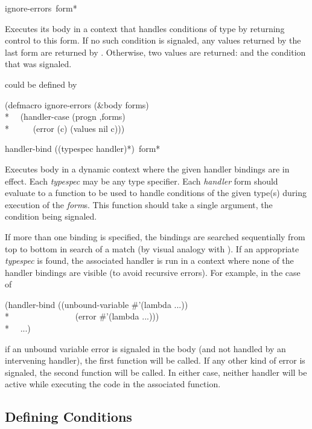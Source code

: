 \begin{defmac}
ignore-errors {\,form}*

  Executes its body in a context that handles conditions of type  by
  returning control to this form. If no such condition is signaled, any
  values returned by the last form are returned by . Otherwise,
  two values are returned:  and the  condition that was signaled.

 could be defined by
\begin{lisp}
(defmacro ignore-errors (\&body forms) \\*
~~{\Xbq}(handler-case (progn ,{\Xatsign}forms) \\*
~~~~~(error (c) (values nil c)))
\end{lisp}
\end{defmac}


\begin{defmac}
handler-bind ({(typespec handler)}*) {\,form}*

  Executes body in a dynamic context where the given handler bindings 
  are in effect.
  Each {\it typespec} may be any type specifier.
  Each {\it handler} form should evaluate to a function to be used to handle conditions 
  of the given type(s) during execution of the {\it form\/}s. This function should
  take a single argument, the condition being signaled.

  If more than one binding is specified, the bindings are searched 
  sequentially from top to bottom in search of a match (by visual analogy
  with ). If an appropriate {\it typespec} is found, the associated handler 
  is run in a context where none of the handler bindings are visible (to avoid
  recursive errors). For example, in the case of
\begin{lisp}
(handler-bind ((unbound-variable \#'(lambda ...)) \\*
~~~~~~~~~~~~~~~(error \#'(lambda ...))) \\*
~~...)
\end{lisp}
  if an unbound variable error is signaled in the body (and not handled
  by an intervening handler), the first function will be called. If any
  other kind of error is signaled, the second function will be called.
  In either case, neither handler will be active while executing the code
  in the associated function.
\end{defmac}


\subsection{Defining Conditions}


